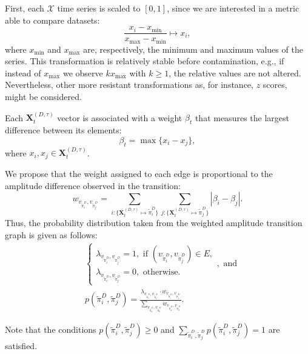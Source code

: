 \documentclass[journal]{IEEEtran}
\begin{document}
First, each $\mathcal{X}$ time series is scaled to $[0, 1]$, since we are interested in a metric able to compare datasets:
\begin{equation}
\frac{x_i - x_{\min}}{x_{\max} - x_{\min}} \longmapsto x_i,
\end{equation}
where $x_{\min}$ and $x_{\max}$ are, respectively, the minimum and maximum values of the series.
This transformation is relatively stable before contamination, e.g., if instead of $x_{\max}$ we observe $k x_{\max}$ with $k\geq 1$, the relative values are not altered. Nevertheless, other more resistant transformations as, for instance, $z$ scores, might be considered.

Each $\mathbf{X}^{(D, \tau)}_t$ vector is associated with a weight $\beta_t$ that measures the largest difference between its elements:
\begin{equation}
\beta_t = \max\{x_i - x_j\},
\end{equation}
where $x_i, x_j \in \mathbf{X}^{(D, \tau)}_t$.

We propose that the weight assigned to each edge is proportional to the amplitude difference observed in the transition:	
\begin{equation}
w_{v_{\widetilde \pi^D_i}, v_{\widetilde \pi^D_j}} =  \sum_{i : \{\mathbf{X}^{(D,\tau)}_t \mapsto \widetilde\pi^D_i\}} \sum_{j : \{\mathbf{X}^{(D,\tau)}_t \mapsto \widetilde\pi^D_j\}} |\beta_i - \beta_j| .
\end{equation}
Thus, the probability distribution taken from the weighted amplitude transition graph is given as follows:	
\begin{align}
&\left\{\begin{array}{l}
\lambda_{v_{\widetilde\pi^D_i}, v_{\widetilde\pi^D_j}} = 1, \text{ if } (v_{\widetilde\pi^D_i}, v_{\widetilde\pi^D_j}) \in {E}, \\
\lambda_{v_{\widetilde\pi^D_i}, v_{\widetilde\pi^D_j}} = 0, \text{ otherwise}.
\end{array}\right., \text{ and} \\
&p(\widetilde\pi^D_i, \widetilde\pi^D_j) = \frac{\lambda_{v_{\widetilde\pi^D_i}, v_{\widetilde\pi^D_j}} \cdot w_{v_{\widetilde\pi^D_i}, v_{\widetilde\pi^D_j}}}{\sum_{v_{\widetilde\pi^D_a}, v_{\widetilde\pi^D_b}} w_{v_{\widetilde\pi^D_a}, v_{\widetilde\pi^D_b}}}.
\end{align}

Note that the conditions $p(\widetilde\pi^D_i, \widetilde\pi^D_j) \ge 0$ and $\sum_{\widetilde\pi^D_i, \widetilde\pi^D_j} p(\widetilde\pi^D_i, \widetilde\pi^D_j) = 1$ are satisfied.
\end{document}

